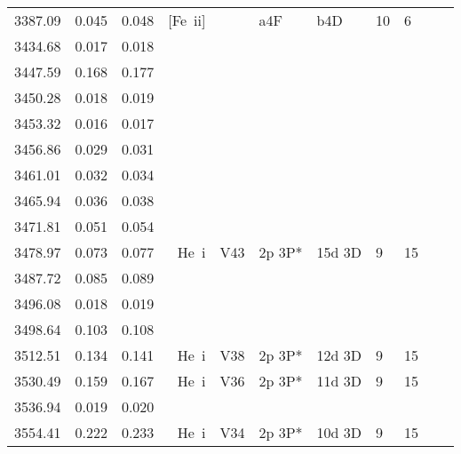 \begin{longtable}{lrlrlllllll}
 3387.09 &   0.045 &   0.048 &  [Fe~{\sc ii}]   &            &  a4F       &  b4D       &         10 &        6    \\
 3434.68 &   0.017 &   0.018                                                                                      \\
 3447.59 &   0.168 &   0.177                                                                                      \\
 3450.28 &   0.018 &   0.019                                                                                      \\
 3453.32 &   0.016 &   0.017                                                                                      \\
 3456.86 &   0.029 &   0.031                                                                                      \\
 3461.01 &   0.032 &   0.034                                                                                      \\
 3465.94 &   0.036 &   0.038                                                                                      \\
 3471.81 &   0.051 &   0.054                                                                                      \\
 3478.97 &   0.073 &   0.077 &  He~{\sc i}      &  V43       &  2p 3P*    &  15d 3D    &          9 &       15    \\
 3487.72 &   0.085 &   0.089                                                                                      \\
 3496.08 &   0.018 &   0.019                                                                                      \\
 3498.64 &   0.103 &   0.108                                                                                      \\
 3512.51 &   0.134 &   0.141 &  He~{\sc i}      &  V38       &  2p 3P*    &  12d 3D    &          9 &       15    \\
 3530.49 &   0.159 &   0.167 &  He~{\sc i}      &  V36       &  2p 3P*    &  11d 3D    &          9 &       15    \\
 3536.94 &   0.019 &   0.020                                                                                      \\
 3554.41 &   0.222 &   0.233 &  He~{\sc i}      &  V34       &  2p 3P*    &  10d 3D    &          9 &       15    \\

\end{longtable}
